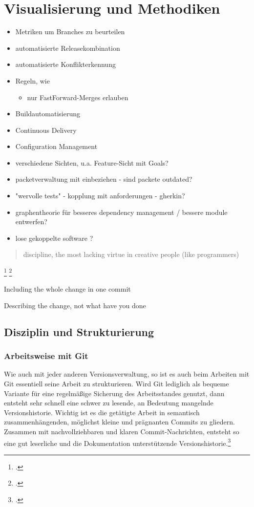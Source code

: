 \chapter{Visualisierung und Methodiken}
\label{ch:visu_meth}



\begin{itemize}
\item Metriken um Branches zu beurteilen
\item automatisierte Releasekombination
\item automatisierte Konflikterkennung
\item Regeln, wie 
	\begin{itemize}
		\item nur FastForward-Merges erlauben
	\end{itemize}	 
\item Buildautomatisierung
\item Continuous Delivery
\item Configuration Management
\item verschiedene Sichten, u.a. Feature-Sicht mit Goals?
\item packetverwaltung mit einbeziehen - sind packete outdated?
\item "wervolle tests" - kopplung mit anforderungen - gherkin?
\item graphentheorie für besseres dependency management / bessere module entwerfen?
\item lose gekoppelte software ?
\end{itemize}

\blockquote {discipline, the most lacking virtue in creative people (like programmers)}
\footcite[Making only one change per commit][]{git-essentials-2017}
\footcite[Writing commit messages before starting to code][]{git-essentials-2017}

Including the whole change in one commit

Describing the change, not what have you done



\section{Disziplin und Strukturierung}
\subsection{Arbeitsweise mit Git}

Wie auch mit jeder anderen Versionsverwaltung, so ist es auch beim Arbeiten mit Git essentiell seine Arbeit zu strukturieren. Wird Git lediglich als bequeme Variante für eine regelmäßige Sicherung des Arbeitsstandes genutzt, dann entsteht sehr schnell eine schwer zu lesende, an Bedeutung mangelnde Versionshistorie. Wichtig ist es die getätigte Arbeit in semantisch zusammenhängenden, möglichst kleine und prägnanten Commits zu gliedern.
Zusammen mit nachvollziehbaren und klaren Commit-Nachrichten, entsteht so eine gut leserliche und die Dokumentation unterstützende Versionshistorie.\footcite[Making only one change per commit][]{git-essentials-2017}
